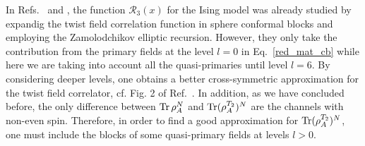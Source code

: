 \documentclass[a4paper,11pt]{article}
\def\Tr{\mathop{\mbox{\normalfont Tr}}\nolimits}
\begin{document}
In Refs.~\cite{Rajabpour} and \cite{Ruggiero}, the function $\mathcal{R}_3(x)$ for the Ising model was
already studied by expandig the twist field correlation function in sphere conformal
blocks and employing the Zamolodchikov elliptic recursion. However, they only take 
the contribution from the primary fields at the level $l=0$ in Eq.~\eqref{red_mat_cb} while here 
we are taking into account all the quasi-primaries until level $l=6$. By considering 
deeper levels, one obtains a better cross-symmetric approximation for the twist field correlator, 
cf. Fig. 2 of Ref.~\cite{Ruggiero}. In addition, as we have concluded before, the only difference 
between $\Tr\rho_A^N$ and $\Tr(\rho_A^{T_2})^N$ are the channels with non-even spin. Therefore,
in order to find a good approximation for $\Tr(\rho_A^{T_2})^N$, one must include the blocks 
of some quasi-primary fields at levels $l>0$.
\end{document}
